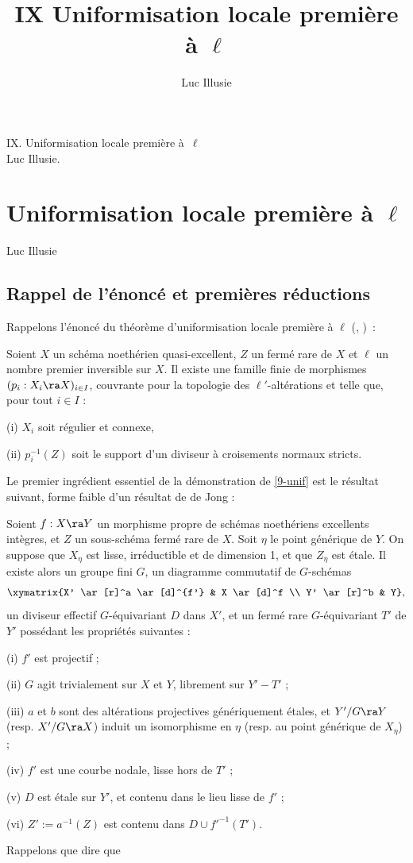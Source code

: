 \documentclass[10pt]{../fichiers-configuration-latex/smfart}
\author{Luc Illusie}
\title{IX Uniformisation locale première à $\ell$}
\begin{document}
\begin{center}
IX. Uniformisation locale première à $\ell$\\
Luc Illusie.
\end{center}

\else
{}
\chapter{Uniformisation locale première à $\ell$}
\begin{center}
Luc Illusie
\end{center}
\fi

\section{Rappel de l'énoncé et premières réductions}
Rappelons l'énoncé du théorème d'uniformisation locale première à $\ell$ (, ) : \begin{theoreme}\label{9-unif} Soient $X$ un schéma
noethérien quasi-excellent, $Z$ un fermé rare de $X$ et $\ell$ un nombre premier inversible sur $X$.
Il existe une famille finie de morphismes $(p_i : X_i \ra X)_{i \in I}$, couvrante pour la topologie
des $\ell'$-altérations et telle que, pour tout $i \in I$ :

(i) $X_i$ soit régulier et connexe,

(ii) $p_i^{-1}(Z)$ soit le support d'un diviseur à croisements normaux stricts.  \end{theoreme} Le
premier ingrédient essentiel de la démonstration de \ref{9-unif} est le résultat suivant, forme
faible d'un résultat de de Jong \cite[2.4]{Families@de_Jong} : \begin{theoreme}\label{9-dJ} Soient
$f : X \ra Y$ un morphisme propre de schémas noethériens excellents intègres, et $Z$ un sous-schéma
fermé rare de $X$. Soit $\eta$ le point générique de $Y$. On suppose que $X_{\eta}$ est lisse,
irréductible et de dimension 1, et que $Z_{\eta}$ est étale. Il existe alors un groupe fini $G$, un
diagramme commutatif de $G$-schémas $$ \xymatrix{X' \ar[r]^a \ar[d]^{f'} & X \ar[d]^f \\ Y' \ar[r]^b
& Y}, $$ un diviseur effectif $G$-équivariant $D$ dans $X'$, et un fermé rare $G$-équivariant $T'$
de $Y'$ possédant les propriétés suivantes :

(i) $f'$ est projectif ;

(ii) $G$ agit trivialement sur $X$ et $Y$, librement sur $Y'-T'$ ;

(iii) $a$ et $b$ sont des altérations projectives génériquement étales, et $Y'/G \ra Y$ (resp. $X'/G
\ra X$) induit un isomorphisme en $\eta$ (resp. au point générique de $X_{\eta}$) ;

(iv) $f'$ est une courbe nodale, lisse hors de $T'$ ;

(v) $D$ est étale sur $Y'$, et contenu dans le lieu lisse de $f'$ ;

(vi) $Z' := a^{-1}(Z)$ est contenu dans $D \cup f'^{-1}(T')$.  \end{theoreme} Rappelons que dire que
\end{document}
